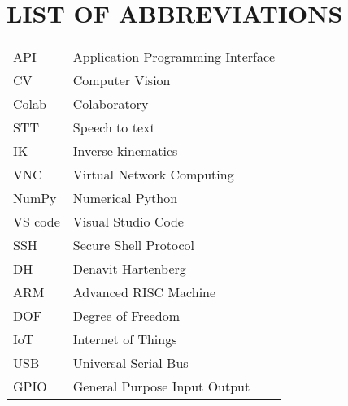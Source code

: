 \newpage
\chapter*{LIST OF ABBREVIATIONS}
\begin{tabular}{l l}
API	 &		Application Programming Interface	\\
CV	 &		Computer Vision	\\
Colab	 &		Colaboratory	\\
STT	 &		Speech to text	\\
IK	 &		Inverse kinematics	\\
VNC 	&		Virtual Network Computing	\\
NumPy	 &		Numerical Python	\\
VS code	 &		Visual Studio Code	\\
SSH  &  Secure Shell Protocol \\
DH  &  Denavit Hartenberg\\
ARM  &  Advanced RISC Machine \\
DOF  &  Degree of Freedom \\
IoT  &  Internet of Things \\
USB  &  Universal Serial Bus \\
GPIO  &  General Purpose Input Output \\
\end{tabular}








